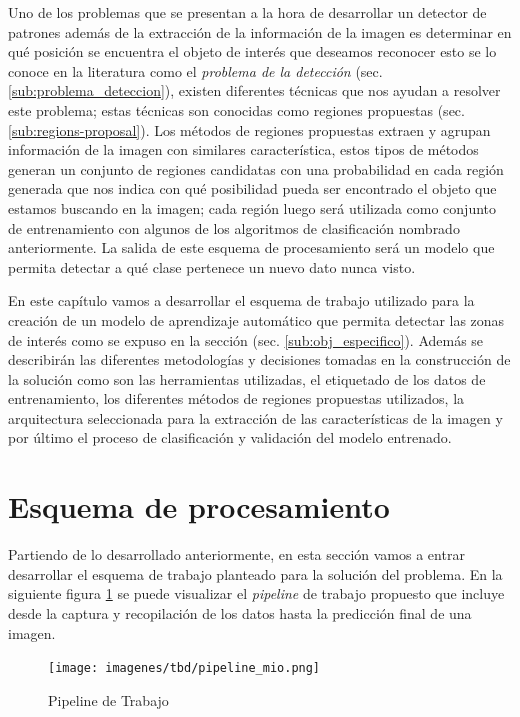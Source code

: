 Uno de los problemas que se presentan a la hora de desarrollar un detector de patrones además de la extracción de la información de la imagen es determinar en qué posición se encuentra el objeto de interés que deseamos reconocer esto se lo conoce en la literatura como el \textit{problema de la detección} (sec. \ref{sub:problema_deteccion}), existen diferentes técnicas que nos ayudan a resolver este problema; estas técnicas son conocidas como regiones propuestas (sec. \ref{sub:regions-proposal}). Los métodos de regiones propuestas extraen y agrupan información de la imagen con similares característica, estos tipos de métodos generan un conjunto de regiones candidatas con una probabilidad en cada región generada que nos indica con qué posibilidad pueda ser encontrado el objeto que estamos buscando en la imagen; cada región luego será utilizada como conjunto de entrenamiento con algunos de los algoritmos de clasificación nombrado anteriormente. La salida de este esquema de procesamiento será un modelo que permita detectar a qué clase pertenece un nuevo dato nunca visto.

En este capítulo vamos a desarrollar el esquema de trabajo utilizado para la creación de un modelo de aprendizaje automático que permita detectar las zonas de interés como se expuso en la sección (sec. \ref{sub:obj_especifico}). Además se describirán las diferentes metodologías y decisiones tomadas en la construcción de la solución como son las herramientas utilizadas, el etiquetado de los datos de entrenamiento, los diferentes  métodos de regiones propuestas utilizados, la arquitectura seleccionada para la extracción de las características de la imagen y por último el proceso de clasificación y validación del modelo entrenado.


\section{Esquema de procesamiento}\label{sec: pipeline}

Partiendo de lo desarrollado anteriormente, en esta sección vamos a entrar desarrollar el esquema de trabajo planteado para la solución del problema. En la siguiente figura \ref{Fig:pipeline-mio} se puede visualizar el \textit{pipeline} de trabajo propuesto que incluye desde la captura y recopilación de los datos hasta la predicción final de una imagen.

\begin{figure}[H] \centering
  \texttt{[image: imagenes/tbd/pipeline\_mio.png]}
  \caption{Pipeline de Trabajo}\label{Fig:pipeline-mio}
\end{figure}

